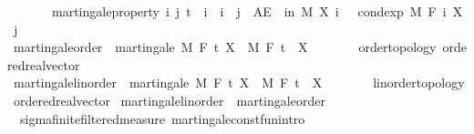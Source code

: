 \begin{isabellebody}
\ \ \ \ \ \ \ martingale{\isacharunderscore}{\kern0pt}property{\isacharcolon}{\kern0pt}\ {\isachardoublequoteopen}{\isasymAnd}i\ j{\isachardot}{\kern0pt}\ t\ {\isasymle}\ i\ {\isasymLongrightarrow}\ i\ {\isasymle}\ j\ {\isasymLongrightarrow}\ AE\ {\isasymxi}\ in\ M{\isachardot}{\kern0pt}\ X\ i\ {\isasymxi}\ {\isacharequal}{\kern0pt}\ cond{\isacharunderscore}{\kern0pt}exp\ M\ {\isacharparenleft}{\kern0pt}F\ i{\isacharparenright}{\kern0pt}\ {\isacharparenleft}{\kern0pt}X\ j{\isacharparenright}{\kern0pt}\ {\isasymxi}{\isachardoublequoteclose}\isanewline
\isanewline
{}\isamarkupfalse%
\ martingale{\isacharunderscore}{\kern0pt}order\ {\isacharequal}{\kern0pt}\ martingale\ M\ F\ t\ X\ \ M\ F\ t\ \ X\ {\isacharcolon}{\kern0pt}{\isacharcolon}{\kern0pt}\ {\isachardoublequoteopen}{\isacharunderscore}{\kern0pt}\ {\isasymRightarrow}\ {\isacharunderscore}{\kern0pt}\ {\isasymRightarrow}\ {\isacharunderscore}{\kern0pt}\ {\isacharcolon}{\kern0pt}{\isacharcolon}{\kern0pt}\ {\isacharbraceleft}{\kern0pt}order{\isacharunderscore}{\kern0pt}topology{\isacharcomma}{\kern0pt}\ ordered{\isacharunderscore}{\kern0pt}real{\isacharunderscore}{\kern0pt}vector{\isacharbraceright}{\kern0pt}{\isachardoublequoteclose}\isanewline
{}\isamarkupfalse%
\ martingale{\isacharunderscore}{\kern0pt}linorder\ {\isacharequal}{\kern0pt}\ martingale\ M\ F\ t\ X\ \ M\ F\ t\ \ X\ {\isacharcolon}{\kern0pt}{\isacharcolon}{\kern0pt}\ {\isachardoublequoteopen}{\isacharunderscore}{\kern0pt}\ {\isasymRightarrow}\ {\isacharunderscore}{\kern0pt}\ {\isasymRightarrow}\ {\isacharunderscore}{\kern0pt}\ {\isacharcolon}{\kern0pt}{\isacharcolon}{\kern0pt}\ {\isacharbraceleft}{\kern0pt}linorder{\isacharunderscore}{\kern0pt}topology{\isacharcomma}{\kern0pt}\ ordered{\isacharunderscore}{\kern0pt}real{\isacharunderscore}{\kern0pt}vector{\isacharbraceright}{\kern0pt}{\isachardoublequoteclose}\isanewline
{}\isamarkupfalse%
\ martingale{\isacharunderscore}{\kern0pt}linorder\ {\isasymsubseteq}\ martingale{\isacharunderscore}{\kern0pt}order%
\isadelimproof
\ %
\endisadelimproof
%
\isatagproof
\isacommand{{\isachardot}{\kern0pt}{\isachardot}{\kern0pt}}\isamarkupfalse%
%
\endisatagproof
{\isafoldproof}%
%
\isadelimproof
%
\endisadelimproof
\isanewline
\isanewline
{}\isamarkupfalse%
\ {\isacharparenleft}{\kern0pt}\ sigma{\isacharunderscore}{\kern0pt}finite{\isacharunderscore}{\kern0pt}filtered{\isacharunderscore}{\kern0pt}measure{\isacharparenright}{\kern0pt}\ martingale{\isacharunderscore}{\kern0pt}const{\isacharunderscore}{\kern0pt}fun{\isacharbrackleft}{\kern0pt}intro{\isacharbrackright}{\kern0pt}{\isacharcolon}{\kern0pt}\ \ \isanewline

\end{isabellebody}
